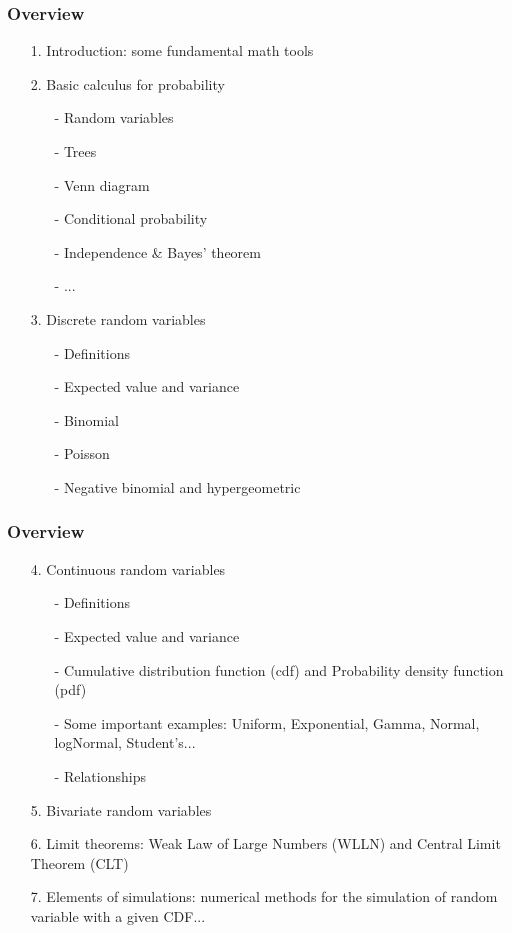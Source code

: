 \documentclass[notes=show,handout]{beamer}
\begin{document}
\begin{frame}
\frametitle{Overview}

\begin{enumerate}
\item[1.]  Introduction: some fundamental math tools 
\item[2.] Basic calculus for probability
\begin{itemize} 
\item[-] Random variables  
\item[-] Trees
\item[-] Venn diagram
\item[-] Conditional probability 
\item[-] Independence \& Bayes' theorem
\item[-] ...
\end{itemize}

\item[3.] Discrete random variables
\begin{itemize} 
\item[-] Definitions
\item[-] Expected value and variance
\item[-] Binomial
\item[-] Poisson
\item[-] Negative binomial and hypergeometric
\end{itemize}

\end{enumerate}
\end{frame}


\begin{frame}
\frametitle{Overview}

\begin{enumerate}
\item[4.]  Continuous random variables

\begin{itemize} 
\item[-] Definitions
\item[-] Expected value and variance
\item[-] Cumulative distribution function (cdf) and Probability density function (pdf)
\item[-] Some important examples: Uniform, Exponential, Gamma, Normal, logNormal, Student's...
\item[-] Relationships
\end{itemize}

\item[5.] Bivariate random variables

\item[6.] Limit theorems: Weak Law of Large Numbers (WLLN) and Central Limit Theorem (CLT)

\item[7.] Elements of simulations:  numerical methods for the simulation of random variable with a given CDF...

\end{enumerate}

\end{frame}
\end{document}
